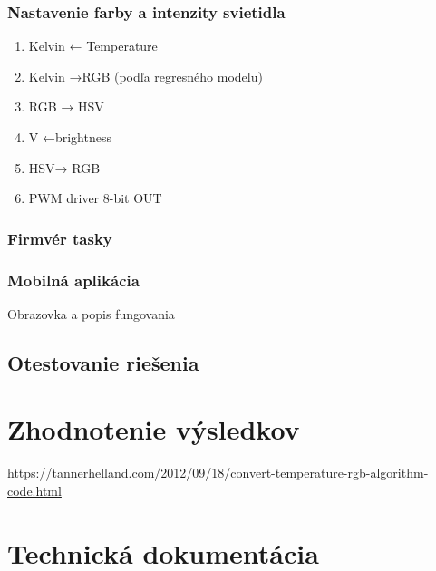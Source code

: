 \documentclass[12pt, a4paper]{article}
\begin{document}
\subsubsection{Nastavenie farby a intenzity svietidla}
\begin{enumerate}
\item Kelvin ← Temperature
\item Kelvin →RGB (podľa regresného modelu)
\item RGB → HSV
\item V ←brightness
\item HSV→ RGB
\item PWM driver 8-bit OUT
\end{enumerate}

\subsubsection{Firmvér tasky}


\subsubsection{Mobilná aplikácia}
Obrazovka a popis fungovania

\subsection{Otestovanie riešenia}


\section{Zhodnotenie výsledkov}

\printbibliography[title={Literatúra}]
\url{https://tannerhelland.com/2012/09/18/convert-temperature-rgb-algorithm-code.html}
\newpage

\section{Technická dokumentácia}
\end{document}
